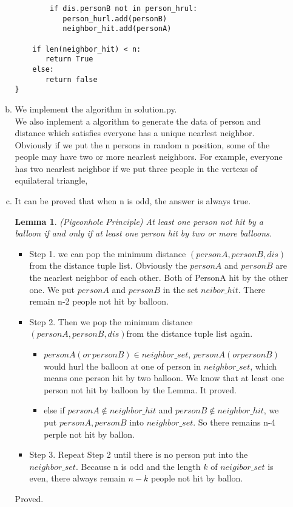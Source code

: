 \documentclass[12pt]{article}
\begin{document}
\begin{enumerate}
\begin{enumerate}[(a)]
\begin{verbatim}
        if dis.personB not in person_hrul:
           person_hurl.add(personB)
           neighbor_hit.add(personA)
    
    if len(neighbor_hit) < n:
       return True
    else:
       return false           
}
\end{verbatim}

  \item We implement the algorithm in solution.py.
    \\
    We also inplement a algorithm to generate the data of person and distance which satisfies everyone has a unique nearlest neighbor. Obviously if we put the n persons in random n position, some of the people may have two or more nearlest neighbors. For example, everyone has two nearlest neighbor if we put three people in the vertexs of equilateral triangle, 
  
  \item 
  It can be proved that when n is odd, the answer is always true.

  \newtheorem{theorem}{\hspace{2em}Lemma}
  
  \begin{theorem}
   (Pigeonhole Principle) At least one person not hit by a balloon if and only if at least one person hit by two or more balloons. 
 \end{theorem}
 
 \begin{itemize}
 \item Step 1. we can pop the minimum distance $(personA, personB, dis)$ from the distance tuple list.
    Obviously the $personA$ and $personB$ are the nearlest neighbor of each other. Both of PersonA hit by the other one. We put $personA$ and $personB$ in the set $neibor\_hit$. There remain  n-2 people not hit by balloon.

  \item Step 2. Then we pop the minimum distance $(personA, personB, dis)$from the distance tuple list again.
    \begin{itemize}
    
    \item $personA( or \, personB) \in neighbor\_set$, $personA( or personB)$ would hurl the balloon at one of person in $neighbor\_set$, which means one person hit by two balloon. We know that at least one person not hit by balloon by the Lemma. It proved. 
    \item else if $personA \notin neighbor\_hit$ and $personB \notin neighbor\_hit$, we put $personA, personB$ into $neighbor\_set$. So there remains n-4 perple not hit by ballon.
    \end{itemize}
  \item Step 3. Repeat Step 2 until there is no person put into the $neighbor\_set$. Because n is odd and the length $k$ of $neigibor\_set$ is even, there always remain $n-k$ people not hit by ballon.    
  \end{itemize}
  Proved.
  

\end{enumerate}
\end{enumerate}
\end{document}
